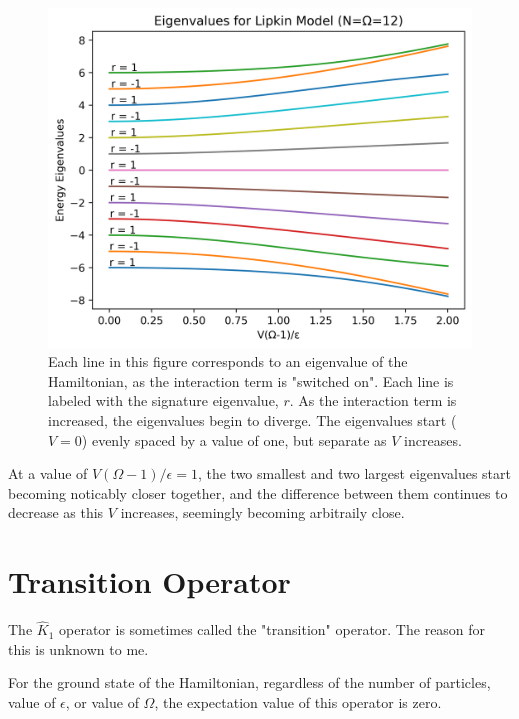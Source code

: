 \documentclass[
a4paper,
10pt,
twoside,
]{article}
\begin{document}
\begin{figure}[H]
	\centering
	\includegraphics[width=0.8\linewidth]{figures/eigenvaluePlot.png}
	\caption{
		Each line in this figure corresponds to an eigenvalue of the Hamiltonian, as the interaction term is "switched on".
		Each line is labeled with the signature eigenvalue, $r$.
		As the interaction term is increased, the eigenvalues begin to diverge.
		The eigenvalues start ($V=0$) evenly spaced by a value of one, but separate as $V$ increases.
	}
	\label{fig: eigenvalues}
\end{figure}

At a value of $V(\Omega-1)/\epsilon = 1$, the two smallest and two largest eigenvalues start becoming noticably closer together, and the difference between them continues to decrease as this $V$ increases, seemingly becoming arbitraily close.

\section{Transition Operator}\label{sec: IIII}


The $\hat{K}_1$ operator is sometimes called the "transition" operator.
The reason for this is unknown to me.

For the ground state of the Hamiltonian, regardless of the number of particles, value of $\epsilon$, or value of $\Omega$, the expectation value of this operator is zero.
\end{document}
